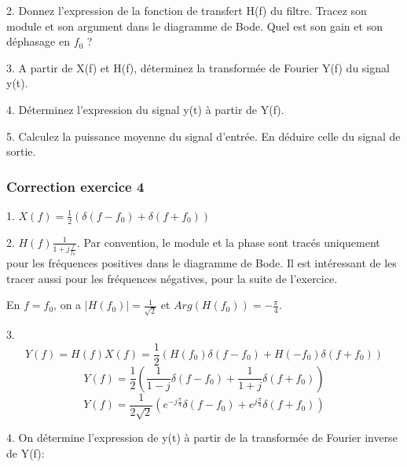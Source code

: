 \documentclass[11pt]{report}
\begin{document}
	\vspace{0.5\baselineskip}
	
	2. Donnez l'expression de la fonction de transfert H(f) du filtre. Tracez son module et son argument dans le diagramme de Bode. Quel est son gain et son déphasage en $f_{0}$ ?
	
	\vspace{0.5\baselineskip}
	
	3. A partir de X(f) et H(f), déterminez la transformée de Fourier Y(f) du signal y(t).
	
	\vspace{0.5\baselineskip}
	
	4. Déterminez l'expression du signal y(t) à partir de Y(f).
	
	\vspace{0.5\baselineskip}
	
	5. Calculez la puissance moyenne du signal d'entrée. En déduire celle du signal de sortie.
	
	\vspace{1\baselineskip}	
	
	\subsubsection{Correction exercice 4}
	
	1. $X(f)=\frac{1}{2}(\delta(f-f_{0})+\delta(f+f_{0}))$
	
	
	2. $H(f)$$\frac{1}{1+j\frac{f}{f_{0}}}$. Par convention, le module et la phase sont tracés uniquement pour les fréquences positives dans le diagramme de Bode. Il est intéressant de les tracer aussi pour les fréquences négatives, pour la suite de l'exercice.
	
	En $f= f_{0}$, on a $|H(f_{0})|=\frac{1}{\sqrt{2}}$ et $Arg(H(f_{0}))=-\frac{\pi}{4}$.
	
	3. \begin{equation*}
	Y(f)=H(f)X(f)=\frac{1}{2}(H(f_{0})\delta(f-f_{0})+H(-f_{0})\delta(f+f_{0}))
	\end{equation*}
	\begin{equation*}
	Y(f)=\frac{1}{2}(\frac{1}{1-j}\delta(f-f_{0})+\frac{1}{1+j}\delta(f+f_{0}))
	\end{equation*}
	\begin{equation*}
	Y(f)=\frac{1}{2\sqrt{2}}(e^{-j\frac{\pi}{4}}\delta(f-f_{0})+e^{j\frac{\pi}{4}}\delta(f+f_{0}))
	\end{equation*}

	
	4. On détermine l'expression de y(t) à partir de la transformée de Fourier inverse de Y(f):
	
\end{document}

